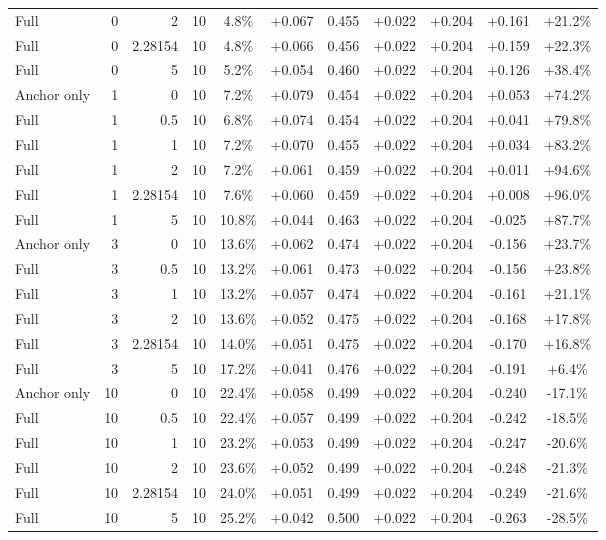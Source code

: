 \begin{table}[htbp]
\begin{tabular}{lrrrccccccc}
Full & 0 & 2 & 10 & 4.8\% & +0.067 & 0.455 & +0.022 & +0.204 & +0.161 & +21.2\% \\
Full & 0 & 2.28154 & 10 & 4.8\% & +0.066 & 0.456 & +0.022 & +0.204 & +0.159 & +22.3\% \\
Full & 0 & 5 & 10 & 5.2\% & +0.054 & 0.460 & +0.022 & +0.204 & +0.126 & +38.4\% \\
Anchor only & 1 & 0 & 10 & 7.2\% & +0.079 & 0.454 & +0.022 & +0.204 & +0.053 & +74.2\% \\
Full & 1 & 0.5 & 10 & 6.8\% & +0.074 & 0.454 & +0.022 & +0.204 & +0.041 & +79.8\% \\
Full & 1 & 1 & 10 & 7.2\% & +0.070 & 0.455 & +0.022 & +0.204 & +0.034 & +83.2\% \\
Full & 1 & 2 & 10 & 7.2\% & +0.061 & 0.459 & +0.022 & +0.204 & +0.011 & +94.6\% \\
Full & 1 & 2.28154 & 10 & 7.6\% & +0.060 & 0.459 & +0.022 & +0.204 & +0.008 & +96.0\% \\
Full & 1 & 5 & 10 & 10.8\% & +0.044 & 0.463 & +0.022 & +0.204 & -0.025 & +87.7\% \\
Anchor only & 3 & 0 & 10 & 13.6\% & +0.062 & 0.474 & +0.022 & +0.204 & -0.156 & +23.7\% \\
Full & 3 & 0.5 & 10 & 13.2\% & +0.061 & 0.473 & +0.022 & +0.204 & -0.156 & +23.8\% \\
Full & 3 & 1 & 10 & 13.2\% & +0.057 & 0.474 & +0.022 & +0.204 & -0.161 & +21.1\% \\
Full & 3 & 2 & 10 & 13.6\% & +0.052 & 0.475 & +0.022 & +0.204 & -0.168 & +17.8\% \\
Full & 3 & 2.28154 & 10 & 14.0\% & +0.051 & 0.475 & +0.022 & +0.204 & -0.170 & +16.8\% \\
Full & 3 & 5 & 10 & 17.2\% & +0.041 & 0.476 & +0.022 & +0.204 & -0.191 & +6.4\% \\
Anchor only & 10 & 0 & 10 & 22.4\% & +0.058 & 0.499 & +0.022 & +0.204 & -0.240 & -17.1\% \\
Full & 10 & 0.5 & 10 & 22.4\% & +0.057 & 0.499 & +0.022 & +0.204 & -0.242 & -18.5\% \\
Full & 10 & 1 & 10 & 23.2\% & +0.053 & 0.499 & +0.022 & +0.204 & -0.247 & -20.6\% \\
Full & 10 & 2 & 10 & 23.6\% & +0.052 & 0.499 & +0.022 & +0.204 & -0.248 & -21.3\% \\
Full & 10 & 2.28154 & 10 & 24.0\% & +0.051 & 0.499 & +0.022 & +0.204 & -0.249 & -21.6\% \\
Full & 10 & 5 & 10 & 25.2\% & +0.042 & 0.500 & +0.022 & +0.204 & -0.263 & -28.5\% \\

\end{tabular}
\end{table}
